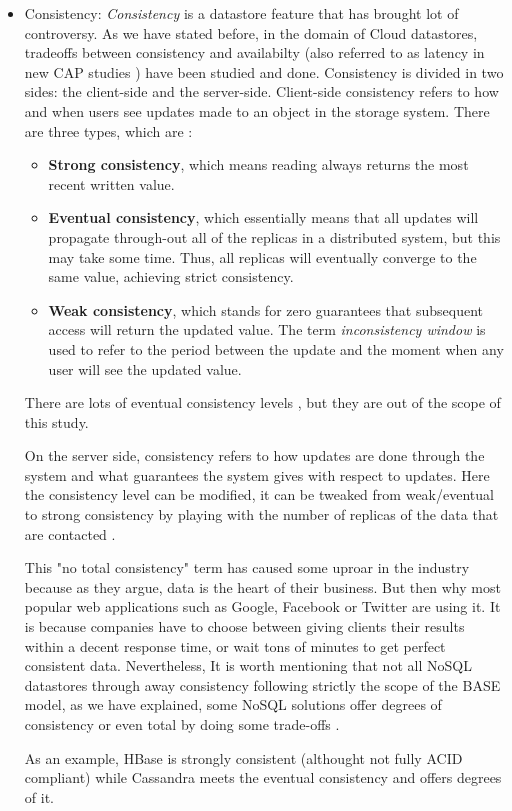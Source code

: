 \begin{itemize}

\item Consistency:
\textit{Consistency} is a datastore feature that has brought lot of controversy. As we have stated before, in the domain of Cloud datastores, tradeoffs between consistency and availabilty (also referred to as latency in new CAP studies \cite{abadi2012consistency}) have been studied and done. Consistency is divided in two sides: the client-side and the server-side. Client-side consistency refers to how and when users see updates made to an object in the storage system. There are three types, which are \cite{vogels2009eventually}:
\begin{itemize}
 \item \textbf{Strong consistency}, which means reading always returns the most recent written value.
\item \textbf{Eventual consistency}, which essentially means that all updates will propagate through-out all of the replicas in a distributed system, but this may take some time. Thus, all replicas will eventually converge to the same value, achieving strict consistency. 
\item \textbf{Weak consistency}, which stands for zero guarantees that subsequent access will return the updated value. The term \textit{inconsistency window} is used to refer to the period between the update and the moment when any user will see the updated value.
\end{itemize}

There are lots of eventual consistency levels \cite{wiki:consistency}, but they are out of the scope of this study.
\par
On the server side, consistency refers to how updates are done through the system and what guarantees the system gives with respect to updates. Here the consistency level can be modified, it can be tweaked from weak/eventual to strong consistency by playing with the number of replicas of the data that are contacted \cite{vogels2009eventually}.
\par
This "no total consistency" term has caused some uproar in the industry because as they argue, data is the heart of their business. But then why most popular web applications such as Google, Facebook or Twitter are using it. It is because companies have to choose between giving clients their results within a decent response time, or wait tons of minutes to get perfect consistent data. Nevertheless, It is worth mentioning that not all NoSQL datastores through away consistency following strictly the scope of the BASE model, as we have explained, some NoSQL solutions offer degrees of consistency or even total by doing some trade-offs \cite{chang2008bigtable} \cite{cooper2008pnuts} \cite{ApacheHBase}.
\par
As an example, HBase is strongly consistent (althought not fully ACID compliant) while Cassandra meets the eventual consistency and offers degrees of it.
\end{itemize}

